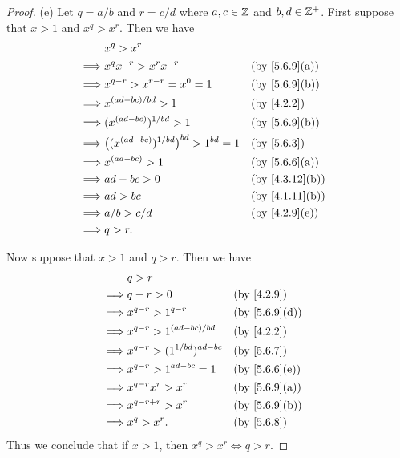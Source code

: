 \begin{proof}{(e)}
  Let \(q = a / b\) and \(r = c / d\) where \(a, c \in \mathbb{Z}\) and \(b, d \in \mathbb{Z}^+\).
  First suppose that \(x > 1\) and \(x^q > x^r\).
  Then we have
  \begin{align*}
             & x^q > x^r                                                                              \\
    \implies & x^q x^{-r} > x^r x^{-r}                              &  & \text{(by \cref{5.6.9}(a))}  \\
    \implies & x^{q - r} > x^{r - r} = x^0 = 1                      &  & \text{(by \cref{5.6.9}(b))}  \\
    \implies & x^{(ad - bc) / bd} > 1                               &  & \by{4.2.2}                   \\
    \implies & (x^{(ad - bc)})^{1 / bd} > 1                         &  & \text{(by \cref{5.6.9}(b))}  \\
    \implies & \big((x^{(ad - bc)})^{1 / bd}\big)^{bd} > 1^{bd} = 1 &  & \by{5.6.3}                   \\
    \implies & x^{(ad - bc)} > 1                                    &  & \text{(by \cref{5.6.6}(a))}  \\
    \implies & ad - bc > 0                                          &  & \text{(by \cref{4.3.12}(b))} \\
    \implies & ad > bc                                              &  & \text{(by \cref{4.1.11}(b))} \\
    \implies & a / b > c / d                                        &  & \text{(by \cref{4.2.9}(e))}  \\
    \implies & q > r.
  \end{align*}

  Now suppose that \(x > 1\) and \(q > r\).
  Then we have
  \begin{align*}
             & q > r                                                               \\
    \implies & q - r > 0                          &  & \by{4.2.9}                  \\
    \implies & x^{q - r} > 1^{q - r}              &  & \text{(by \cref{5.6.9}(d))} \\
    \implies & x^{q - r} > 1^{(ad - bc) / bd}     &  & \by{4.2.2}                  \\
    \implies & x^{q - r} > (1^{1 / bd})^{ad - bc} &  & \by{5.6.7}                  \\
    \implies & x^{q - r} > 1^{ad - bc} = 1        &  & \text{(by \cref{5.6.6}(e))} \\
    \implies & x^{q - r} x^r > x^r                &  & \text{(by \cref{5.6.9}(a))} \\
    \implies & x^{q - r + r} > x^r                &  & \text{(by \cref{5.6.9}(b))} \\
    \implies & x^q > x^r.                         &  & \by{5.6.8}
  \end{align*}
  Thus we conclude that if \(x > 1\), then \(x^q > x^r \iff q > r\).


\end{proof}
